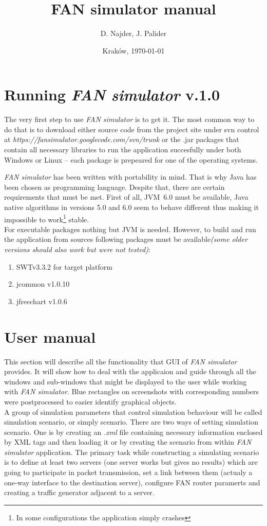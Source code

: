 \documentclass[a4paper,12pt]{article}
\title{FAN simulator manual}
\author{D. Najder, J. Palider}
\date{Krak\'ow, \today}
\begin{document}
	\maketitle
	
	\newpage
		
	\section{Running \emph{FAN simulator} v.1.0}
	
	The very first step to use \emph{FAN simulator} is to get it. The most common
	way to do that is to download either source code from the project site under
	svn control at \emph{https://fansimulator.googlecode.com/svn/trunk} or the
	.jar packages that contain all necessary libraries to run the application
	succesfully under both Windows or Linux -- each package is prepeared for one of
	the operating systems.	
	
	\emph{FAN simulator} has been written with portability in mind. That is why
	Java has been chosen as programming language. Despite that, there are certain
	requirements that must be met. First of all, JVM~6.0 must be available, Java
	native algorithms in versions 5.0 and 6.0 seem to behave different thus making
	it impossible to work\footnote{In some configurations the application
	simply crashes} stable.\\
	For executable packages nothing but JVM is needed. However, to build and run
	the application from sources following packages must be available\emph{(some
	older versions should also work but were not tested)}:
	\begin{enumerate}
	\item {SWTv3.3.2 for target platform}
	\item {jcommon v1.0.10}
	\item {jfreechart v1.0.6}
	\end{enumerate}
	
	
	\section{User manual}
	This section will describe all the functionality that GUI of \emph{FAN
	simulator} provides. It will show how to deal with the applicaion and guide
	through all the windows and sub-windows that might be displayed to the user
	while working with \emph{FAN simulator}.
	Blue rectangles on screenshots with corresponding numbers were postprocessed
	to easier identify graphical objects.\\	
	A group of simulation parameters that control simulation behaviour will be
	called simulation scenario, or simply scenario. There are two ways of setting
	simulation scenario. One is by creating an \emph{.xml} file containing
	necessary information enclosed by XML tags and then loading it or by creating
	the scenario from within \emph{FAN simulator} application. 
	The primary task while constructing a simulating scenario is to define at
	least two servers (one server works but gives no results) which are
	going to participate in packet transmission, set a link between them (actualy
	a one-way interface to the destination server), configure FAN router paramerts
	and creating a traffic generator adjacent to a server.
	
\end{document}
